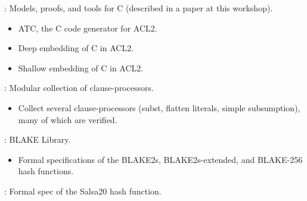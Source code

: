 
\begin{frame}

\newlibtitle

:
Models, proofs, and tools for C (described in a paper at this workshop).
\begin{itemize}
\item ATC, the C code generator for ACL2.
\item Deep embedding of C in ACL2.
\item Shallow embedding of C in ACL2.
\end{itemize}

\end{frame}


\begin{frame}

\newlibtitle

:
Modular collection of clause-processors.
\begin{itemize}
\item Collect several clause-processors (subst, flatten literals, simple subsumption), many of which are verified.
\end{itemize}

\end{frame}


\begin{frame}

\newlibtitle

: BLAKE Library.
\begin{itemize}
\item Formal specifications of the BLAKE2s, BLAKE2s-extended, and
  BLAKE-256 hash functions.
\end{itemize}

\end{frame}


\begin{frame}

\newlibtitle

:
Formal spec of the Salsa20 hash function.

\end{frame}

